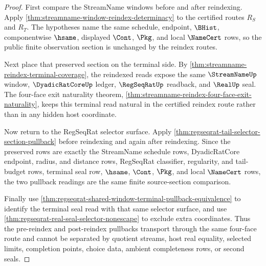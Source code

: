 \begin{proof}
First compare the StreamName windows before and after reindexing. Apply \autoref{thm:streamname-window-reindex-determinacy} to the certified routes $R_S$ and $R_T$. The hypotheses name the same schedule, endpoint, $\BHist$, componentwise $\hsame$, displayed $\Cont$, $\Pkg$, and local $\NameCert$ rows, so the public finite observation section is unchanged by the reindex routes.

Next place that preserved section on the terminal side. By \autoref{thm:streamname-reindex-terminal-coverage}, the reindexed reads expose the same $\StreamNameUp$ window, $\DyadicRatCoreUp$ ledger, $\RegSeqRatUp$ readback, and $\RealUp$ seal. The four-face exit naturality theorem, \autoref{thm:streamname-reindex-four-face-exit-naturality}, keeps this terminal read natural in the certified reindex route rather than in any hidden host coordinate.

Now return to the RegSeqRat selector surface. Apply \autoref{thm:regseqrat-tail-selector-section-pullback} before reindexing and again after reindexing. Since the preserved rows are exactly the StreamName schedule rows, DyadicRatCore endpoint, radius, and distance rows, RegSeqRat classifier, regularity, and tail-budget rows, terminal seal row, $\hsame$, $\Cont$, $\Pkg$, and local $\NameCert$ rows, the two pullback readings are the same finite source-section comparison.

Finally use \autoref{thm:regseqrat-shared-window-terminal-pullback-equivalence} to identify the terminal seal read with that same selector surface, and use \autoref{thm:regseqrat-real-seal-selector-nonescape} to exclude extra coordinates. Thus the pre-reindex and post-reindex pullbacks transport through the same four-face route and cannot be separated by quotient streams, host real equality, selected limits, completion points, choice data, ambient completeness rows, or second seals.
\end{proof}

